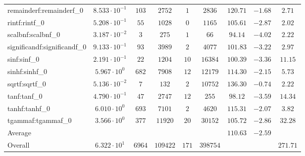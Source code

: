 \begin{tabular}{|l|c|c|c|c|c|c|c|c|}
remainderf:remainderf\_0     & $ 8.533 \cdot 10^{-1} $ & $ 103    $ & $ 2752   $ & $ 1   $ & $ 2836   $ & $ 120.71      $ & $ -1.68   $ & $ 2.71    $ \\
rintf:rintf\_0               & $ 5.208 \cdot 10^{-1} $ & $ 55     $ & $ 1028   $ & $ 0   $ & $ 1165   $ & $ 105.61      $ & $ -2.87   $ & $ 2.02    $ \\
scalbnf:scalbnf\_0           & $ 3.187 \cdot 10^{-2} $ & $ 3      $ & $ 275    $ & $ 1   $ & $ 66     $ & $ 94.14       $ & $ -4.02   $ & $ 2.22    $ \\
significandf:significandf\_0 & $ 9.133 \cdot 10^{-1} $ & $ 93     $ & $ 3989   $ & $ 2   $ & $ 4077   $ & $ 101.83      $ & $ -3.22   $ & $ 2.97    $ \\
sinf:sinf\_0                 & $ 2.191 \cdot 10^{-1} $ & $ 22     $ & $ 1204   $ & $ 10  $ & $ 16384  $ & $ 100.39      $ & $ -3.36   $ & $ 11.15   $ \\
sinhf:sinhf\_0               & $ 5.967 \cdot 10^{0}  $ & $ 682    $ & $ 7908   $ & $ 12  $ & $ 12179  $ & $ 114.30      $ & $ -2.15   $ & $ 5.73    $ \\
sqrtf:sqrtf\_0               & $ 5.136 \cdot 10^{-2} $ & $ 7      $ & $ 132    $ & $ 2   $ & $ 10752  $ & $ 136.30      $ & $ -0.74   $ & $ 2.22    $ \\
tanf:tanf\_0                 & $ 4.790 \cdot 10^{-1} $ & $ 47     $ & $ 2747   $ & $ 12  $ & $ 255    $ & $ 98.12       $ & $ -3.59   $ & $ 14.34   $ \\
tanhf:tanhf\_0               & $ 6.010 \cdot 10^{0}  $ & $ 693    $ & $ 7101   $ & $ 2   $ & $ 4620   $ & $ 115.31      $ & $ -2.07   $ & $ 3.82    $ \\
tgammaf:tgammaf\_0           & $ 3.566 \cdot 10^{0}  $ & $ 377    $ & $ 11920  $ & $ 20  $ & $ 30152  $ & $ 105.72      $ & $ -2.86   $ & $ 32.28   $ \\
\hline
Average                      & $                     $ & $        $ & $        $ & $     $ & $        $ & $ 110.63      $ & $ -2.59   $ & $         $ \\
\hline
Overall                      & $ 6.322 \cdot 10^{1}  $ & $ 6964   $ & $ 109422 $ & $ 171 $ & $ 398754 $ & $             $ & $         $ & $ 271.71  $ \\
\hline
\end{tabular}
